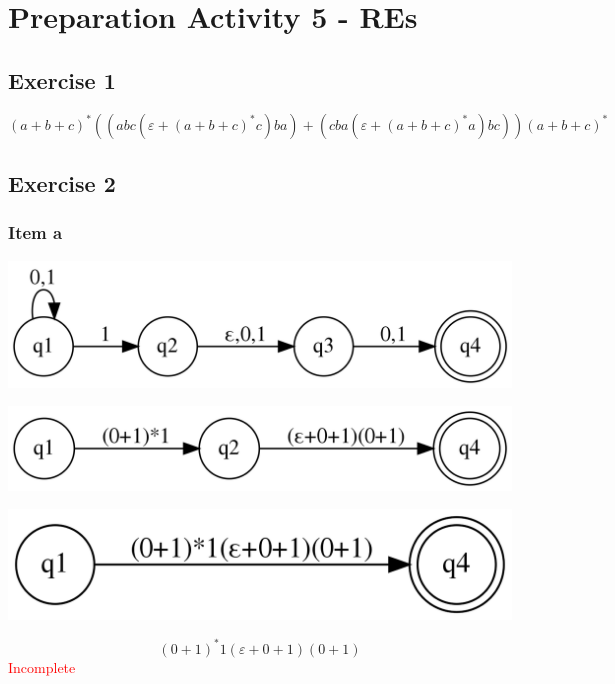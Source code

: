 \setcounter{section}{4}
\section{Preparation Activity 5 - REs}
{
\renewcommand{\thesubsubsection}{\thesubsection\alph{subsubsection}}
\subsection{Exercise 1}
\begin{equation*}
	(a+b+c)^\ast ((abc(\varepsilon+(a+b+c)^\ast c)ba)+(cba(\varepsilon + (a+b+c)^\ast a)bc))(a+b+c)^\ast
\end{equation*}
\subsection{Exercise 2}
\subsubsection{Item a}
\begin{center} \includegraphics[scale=0.12]{PA05_2a_1} \end{center}
\begin{center} \includegraphics[scale=0.12]{PA05_2a_2} \end{center}
\begin{center} \includegraphics[scale=0.12]{PA05_2a_3} \end{center}
\begin{equation*}
	(0+1)^\ast 1(\varepsilon+0+1)(0+1)
\end{equation*}
\textcolor{red}{Incomplete}
}